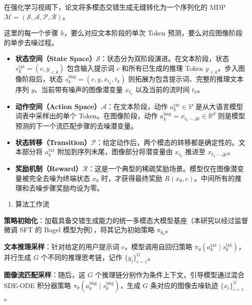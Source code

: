 在强化学习视阈下，论文将多模态交错生成无缝转化为一个序列化的 MDP \(\mathcal{M}=(\mathcal{S},\mathcal{A},\mathcal{P},\mathcal{R})\)。

这里的每一个步骤 \(k\)，要么对应文本阶段的单次 Token 预测，要么对应图像阶段的单步去噪过程。

\begin{itemize}
\tightlist
\item
  \textbf{状态空间（State Space）\(\mathcal{S}\)}：状态分为双阶段演进。在文本阶段，状态 \(s_k^{\mathrm{txt}}=(c,y_{\lt k})\) 包含输入提示词 \(c\) 和所有已生成的推理 Token \(y_{\lt k}\)。步入图像阶段后，状态 \(s_k^{\mathrm{img}}=(c,y,x_{t_k},t_k)\) 则拓展为包含提示词、完整的推理文本序列 \(y\)、当前带有噪声的图像潜变量 \(x_{t_k}\) 以及当前的流时间 \(t_k\)。
\item
  \textbf{动作空间（Action Space）\(\mathcal{A}\)}：在文本阶段，动作 \(a_k^{\mathrm{txt}}\in\mathcal{V}\) 是从大语言模型词表中采样出的单个 Token。在图像阶段，动作 \(a_k^{\mathrm{img}}=x_{t_k-\Delta t}\in\mathbb{R}^d\) 则是模型预测的下一个流匹配步骤的去噪潜变量。
\item
  \textbf{状态转移（Transition）\(\mathcal{P}\)}：给定动作后，两个模态的转移都是确定性的。文本部分将 \(a_k^{\mathrm{txt}}\) 附加到序列末尾，图像部分将潜变量由 \(x_{t_k}\) 推进至 \(x_{t_k-\Delta t}\)。
\item
  \textbf{奖励机制（Reward）\(\mathcal{R}\)}：这是一个典型的稀疏奖励场景。模型仅在图像潜变量被完全去噪为终端状态 \(x_0\) 时，才获得最终奖励 \(R(x_0,c)\)。中间所有的推理和去噪步骤奖励均设为零。
\end{itemize}

\begin{enumerate}
\def\labelenumi{\arabic{enumi}.}
\setcounter{enumi}{1}
\tightlist
\item
  算法工作流
\end{enumerate}

\textbf{策略初始化}：加载具备交错生成能力的统一多模态大模型基座（本研究以经过监督微调 SFT 的 Bagel 模型为例），将其记为初始策略 \(\pi_{\theta_0}\)。

\textbf{文本推理采样}：针对给定的用户提示词 \(c\)，模型调用自回归策略 \(\pi_{\theta}(a_k^{\mathrm{txt}}\mid s_k^{\mathrm{txt}})\)，并行生成 \(G\) 个不同的推理思考链，记作 \(\{y_i\}_{i=1}^{G}\)。

\textbf{图像流匹配采样}：随后，这 \(G\) 个推理链分别作为条件上下文，引导模型通过混合 SDE-ODE 积分器策略 \(\pi_{\theta}(a_k^{\mathrm{img}}\mid s_k^{\mathrm{img}})\)，生成 \(G\) 条对应的图像去噪轨迹 \(\{x_i\}_{i=1}^{G}\)。


